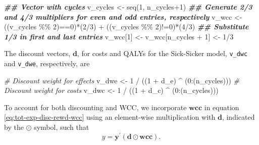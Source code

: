 \documentclass[
]{article}
\newenvironment{Shaded}{\begin{snugshade}}{\end{snugshade}}
\newcommand{\CommentTok}[1]{\textcolor[rgb]{0.56,0.35,0.01}{\textit{#1}}}
\newcommand{\DecValTok}[1]{\textcolor[rgb]{0.00,0.00,0.81}{#1}}
\newcommand{\DocumentationTok}[1]{\textcolor[rgb]{0.56,0.35,0.01}{\textbf{\textit{#1}}}}
\newcommand{\FunctionTok}[1]{\textcolor[rgb]{0.00,0.00,0.00}{#1}}
\newcommand{\NormalTok}[1]{#1}
\newcommand{\OtherTok}[1]{\textcolor[rgb]{0.56,0.35,0.01}{#1}}
\newcommand{\SpecialCharTok}[1]{\textcolor[rgb]{0.00,0.00,0.00}{#1}}
\begin{document}
\begin{Shaded}
\begin{Highlighting}[]
\DocumentationTok{\#\# Vector with cycles}
\NormalTok{v\_cycles }\OtherTok{\textless{}{-}} \FunctionTok{seq}\NormalTok{(}\DecValTok{1}\NormalTok{, n\_cycles}\SpecialCharTok{+}\DecValTok{1}\NormalTok{)}
\DocumentationTok{\#\# Generate 2/3 and 4/3 multipliers for even and odd entries, respectively}
\NormalTok{v\_wcc }\OtherTok{\textless{}{-}}\NormalTok{ ((v\_cycles }\SpecialCharTok{\%\%} \DecValTok{2}\NormalTok{)}\SpecialCharTok{==}\DecValTok{0}\NormalTok{)}\SpecialCharTok{*}\NormalTok{(}\DecValTok{2}\SpecialCharTok{/}\DecValTok{3}\NormalTok{) }\SpecialCharTok{+}\NormalTok{ ((v\_cycles }\SpecialCharTok{\%\%} \DecValTok{2}\NormalTok{)}\SpecialCharTok{!=}\DecValTok{0}\NormalTok{)}\SpecialCharTok{*}\NormalTok{(}\DecValTok{4}\SpecialCharTok{/}\DecValTok{3}\NormalTok{)}
\DocumentationTok{\#\# Substitute 1/3 in first and last entries}
\NormalTok{v\_wcc[}\DecValTok{1}\NormalTok{] }\OtherTok{\textless{}{-}}\NormalTok{ v\_wcc[n\_cycles }\SpecialCharTok{+} \DecValTok{1}\NormalTok{] }\OtherTok{\textless{}{-}} \DecValTok{1}\SpecialCharTok{/}\DecValTok{3}
\end{Highlighting}
\end{Shaded}

The discount vectors, \(\mathbf{d}\), for costs and QALYs for the Sick-Sicker model, \texttt{v\_dwc} and \texttt{v\_dwe}, respectively, are

\begin{Shaded}
\begin{Highlighting}[]
\CommentTok{\# Discount weight for effects}
\NormalTok{v\_dwe }\OtherTok{\textless{}{-}} \DecValTok{1} \SpecialCharTok{/}\NormalTok{ ((}\DecValTok{1} \SpecialCharTok{+}\NormalTok{ d\_e) }\SpecialCharTok{\^{}}\NormalTok{ (}\DecValTok{0}\SpecialCharTok{:}\NormalTok{(n\_cycles)))  }
\CommentTok{\# Discount weight for costs }
\NormalTok{v\_dwc }\OtherTok{\textless{}{-}} \DecValTok{1} \SpecialCharTok{/}\NormalTok{ ((}\DecValTok{1} \SpecialCharTok{+}\NormalTok{ d\_c) }\SpecialCharTok{\^{}}\NormalTok{ (}\DecValTok{0}\SpecialCharTok{:}\NormalTok{(n\_cycles)))    }
\end{Highlighting}
\end{Shaded}

To account for both discounting and WCC, we incorporate \(\mathbf{wcc}\) in equation \eqref{eq:tot-exp-disc-rewd-wcc} using an element-wise multiplication with \(\mathbf{d}\), indicated by the \(\odot\) symbol, such that
\begin{equation}
 y = \mathbf{y}^{'} \left(\mathbf{d} \odot \mathbf{wcc}\right).
 \label{eq:tot-exp-disc-rewd-wcc}
\end{equation}
\end{document}
